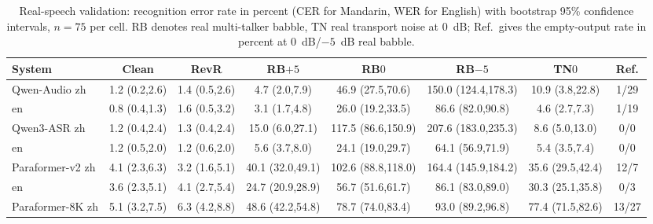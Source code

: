\begin{table}[t]
\centering
\caption{Real-speech validation: recognition error rate in percent
(CER for Mandarin, WER for English) with bootstrap 95\% confidence
intervals, $n = 75$ per cell. RB denotes real multi-talker babble, TN real
transport noise at 0~dB; Ref.\ gives the empty-output rate in percent at
0~dB/$-5$~dB real babble.}
\label{tab:realval}
\footnotesize
\setlength{\tabcolsep}{2.1pt}
\begin{tabular}{lccccccc}
\toprule
System & Clean & RevR & RB$+5$ & RB$0$ & RB$-5$ & TN$0$ & Ref. \\
\midrule
Qwen-Audio zh & 1.2 (0.2,2.6) & 1.4 (0.5,2.6) & 4.7 (2.0,7.9) & 46.9 (27.5,70.6) & 150.0 (124.4,178.3) & 10.9 (3.8,22.8) & 1/29 \\
\enspace en & 0.8 (0.4,1.3) & 1.6 (0.5,3.2) & 3.1 (1.7,4.8) & 26.0 (19.2,33.5) & 86.6 (82.0,90.8) & 4.6 (2.7,7.3) & 1/19 \\
Qwen3-ASR zh & 1.2 (0.4,2.4) & 1.3 (0.4,2.4) & 15.0 (6.0,27.1) & 117.5 (86.6,150.9) & 207.6 (183.0,235.3) & 8.6 (5.0,13.0) & 0/0 \\
\enspace en & 1.2 (0.5,2.0) & 1.2 (0.6,2.0) & 5.6 (3.7,8.0) & 24.1 (19.0,29.7) & 64.1 (56.9,71.9) & 5.4 (3.5,7.4) & 0/0 \\
Paraformer-v2 zh & 4.1 (2.3,6.3) & 3.2 (1.6,5.1) & 40.1 (32.0,49.1) & 102.6 (88.8,118.0) & 164.4 (145.9,184.2) & 35.6 (29.5,42.4) & 12/7 \\
\enspace en & 3.6 (2.3,5.1) & 4.1 (2.7,5.4) & 24.7 (20.9,28.9) & 56.7 (51.6,61.7) & 86.1 (83.0,89.0) & 30.3 (25.1,35.8) & 0/3 \\
Paraformer-8K zh & 5.1 (3.2,7.5) & 6.3 (4.2,8.8) & 48.6 (42.2,54.8) & 78.7 (74.0,83.4) & 93.0 (89.2,96.8) & 77.4 (71.5,82.6) & 13/27 \\
\bottomrule
\end{tabular}
\end{table}

